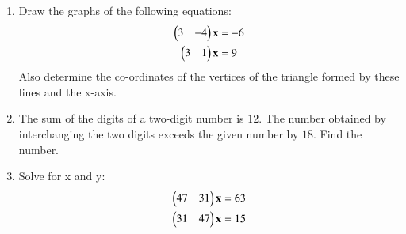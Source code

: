 \renewcommand{\theequation}{\theenumi}
\begin{enumerate}[label=\thesection.\arabic*.,ref=\thesection.\theenumi]

\item Draw the graphs of the following equations: 
\begin{align}\label{linform/2006/2/11/eq:1}
    \begin{pmatrix}3&-4\end{pmatrix}\mathbf{x}&=-6
    \\
\label{linform/2006/2/11/eq:2}
    \begin{pmatrix}3&1\end{pmatrix}\mathbf{x}&=9
\end{align}Also determine the co-ordinates of the vertices of the triangle formed by these lines and the x-axis.
\\
\solution

\item The sum of the digits of a two-digit number is $12$. The number obtained by interchanging the two digits exceeds the given number by $18$. Find the number.
\\
\solution

\item Solve for x and y: 
\begin{align}
 \begin{pmatrix}47&31\end{pmatrix}\mathbf{x}&=63\\
 \begin{pmatrix}31&47\end{pmatrix}\mathbf{x}&=15 
\end{align} 
\\
\solution

\end{enumerate}